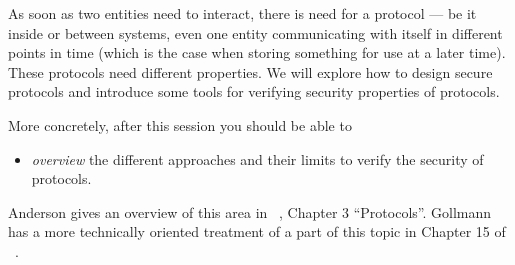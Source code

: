 As soon as two entities need to interact, there is need for a protocol --- be 
it inside or between systems, even one entity communicating with itself in 
different points in time (which is the case when storing something for use at a 
later time).
These protocols need different properties.
We will explore how to design secure protocols and introduce some tools for 
verifying security properties of protocols.

More concretely, after this session you should be able to
\begin{itemize}
  \item \emph{overview} the different approaches and their limits to verify the 
    security of protocols.
\end{itemize}

Anderson gives an overview of this area in 
~\cite{Anderson2008sea}, Chapter 
3 \enquote{Protocols}.
Gollmann has a more technically oriented treatment of a part of this topic in 
Chapter 15 of ~\cite{Gollmann2011cs}.
